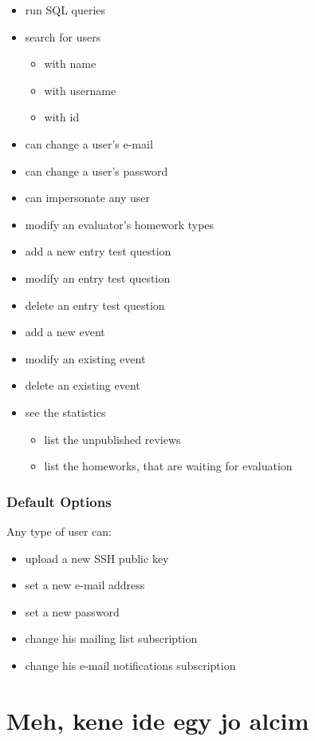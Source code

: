 \begin{itemize}
	\item run SQL queries
	\item search for users
	\begin{itemize}
		\item with name
		\item with username
		\item with id
	\end{itemize}
	\item can change a user's e-mail
	\item can change a user's password
	\item can impersonate any user
	\item modify an evaluator's homework types
	\item add a new entry test question
	\item modify an entry test question
	\item delete an entry test question
	\item add a new event
	\item modify an existing event
	\item delete an existing event
	\item see the statistics
	\begin{itemize}
		\item list the unpublished reviews
		\item list the homeworks, that are waiting for evaluation
	\end{itemize}
\end{itemize}

\subsubsection{Default Options}

Any type of user can:

\begin{itemize}
	\item upload a new SSH public key
	\item set a new e-mail address
	\item set a new password
	\item change his mailing list subscription
	\item change his e-mail notifications subscription
\end{itemize}

\section{Meh, kene ide egy jo alcim}



